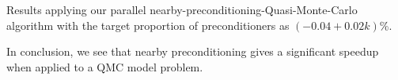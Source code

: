 \begin{table}
  \centering
  
  \caption{Results applying our parallel nearby-preconditioning-Quasi-Monte-Carlo algorithm with the target proportion of preconditioners as $(-0.04+0.02k)$\%.}\label{tab:nbpcqmcpar}
  \end{table}

    In conclusion, we see that nearby preconditioning gives a significant speedup when applied to a QMC model problem.%
    

    





